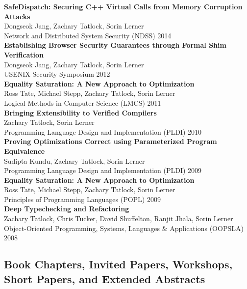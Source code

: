 \documentclass[10pt]{article}
\begin{document}
\textbf{%
SafeDispatch: Securing C++ Virtual Calls from Memory Corruption Attacks
} \\
Dongseok Jang, Zachary Tatlock, Sorin Lerner \\
Network and Distributed System Security (NDSS) 2014 \\

\textbf{%
Establishing Browser Security Guarantees through Formal Shim Verification
} \\
Dongseok Jang, Zachary Tatlock, Sorin Lerner \\
USENIX Security Symposium 2012 \\

\textbf{%
Equality Saturation: A New Approach to Optimization
} \\
Ross Tate, Michael Stepp, Zachary Tatlock, Sorin Lerner \\
Logical Methods in Computer Science (LMCS) 2011 \\

\textbf{%
Bringing Extensibility to Verified Compilers
} \\
Zachary Tatlock, Sorin Lerner \\
Programming Language Design and Implementation (PLDI) 2010 \\

\textbf{%
Proving Optimizations Correct using Parameterized Program Equivalence
} \\
Sudipta Kundu, Zachary Tatlock, Sorin Lerner \\
Programming Language Design and Implementation (PLDI) 2009 \\

\textbf{%
Equality Saturation: A New Approach to Optimization
} \\
Ross Tate, Michael Stepp, Zachary Tatlock, Sorin Lerner \\
Principles of Programming Languages (POPL) 2009 \\

\textbf{%
Deep Typechecking and Refactoring
} \\
Zachary Tatlock, Chris Tucker, David Shuffelton, Ranjit Jhala, Sorin Lerner \\
Object-Oriented Programming, Systems, Languages \& Applications (OOPSLA) 2008 \\


\subsection*{Book Chapters, Invited Papers, Workshops, Short Papers, and Extended Abstracts}
\end{document}
